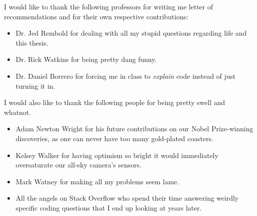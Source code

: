 I would like to thank the following professors for writing me letter of recommendations and for their own respective contributions:
\begin{itemize}
	\item Dr. Jed Rembold for dealing with all my stupid questions regarding life and this thesis.

	\item Dr. Rick Watkins for being pretty dang funny.

	\item Dr. Daniel Borrero for forcing me in class to \textit{explain} code instead of just turning it in.

\end{itemize}
I would also like to thank the following people for being pretty swell and whatnot.

\begin{itemize}
	\item Adam Newton Wright for his future contributions on our Nobel Prize-winning discoveries, as one can never have too many gold-plated coasters.

	\item Kelsey Walker for having optimism so bright it would immediately oversaturate our all-sky camera's sensors.

	\item Mark Watney for making all my problems seem lame.

	\item All the angels on Stack Overflow who spend their time answering weirdly specific coding questions that I end up looking at years later.
\end{itemize}
